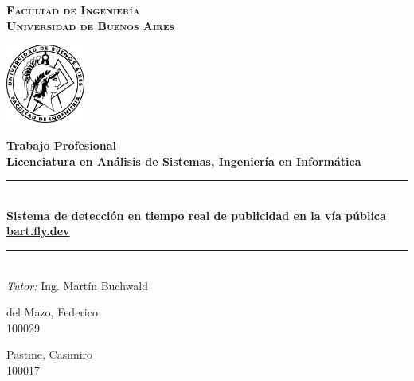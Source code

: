\documentclass[a4paper]{article}
\begin{document}
\begin{titlepage}

    \centering
    \hfill
    \begin{minipage}{0.7\textwidth}
            \centering
            \LARGE
            \textsc{\textbf{Facultad de Ingeniería}}\\[0.1cm]
            \textsc{\textbf{Universidad de Buenos Aires}}
        \end{minipage}
        \begin{minipage}{2.6cm}
            \centering
            \includegraphics[width=2.6cm]{./img/fiuba.png}
        \end{minipage}

    \vspace{3cm}
    \huge \bfseries Trabajo Profesional \\
    \LARGE \bfseries Licenciatura en Análisis de Sistemas, Ingeniería en Informática
    \vspace{2cm}

    \rule{\linewidth}{0.3mm} \\[0.1cm]
    \huge \bfseries Sistema de detección en tiempo real de publicidad en la vía pública\\
    \vspace{0.1cm}
    \small\href{https://bart.fly.dev}{bart.fly.dev}
    \rule{\linewidth}{0.3mm}\\[0.7cm]

    \large \emph{Tutor:} Ing. Martín Buchwald\\[0.6cm]
    \begin{minipage}{0.4\textwidth}
        \begin{flushleft}
            \centering
            \large del Mazo, Federico \\
            100029
        \end{flushleft}
    \end{minipage}
    \begin{minipage}{0.4\textwidth}
        \begin{flushright}
            \centering
            \large Pastine, Casimiro \\
            100017
        \end{flushright}
    \end{minipage}
    \restoregeometry
\end{titlepage}
\end{document}
